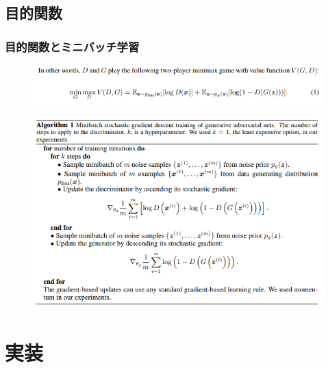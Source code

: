 \documentclass[dvipdfmx,12pt]{beamer}
\begin{document}
\subsection{目的関数}
\begin{frame}
	\frametitle{目的関数とミニバッチ学習}
	\begin{figure}[htbp]
	\begin{center}
	\includegraphics[width=\hsize]{./mokuteki.png}
	\end{center}
	\end{figure}
	\begin{figure}[htbp]
	\begin{center}
	\includegraphics[width=\hsize]{./gaku.png}
	\end{center}
	\end{figure}
\end{frame}

\section{実装}
\end{document}
